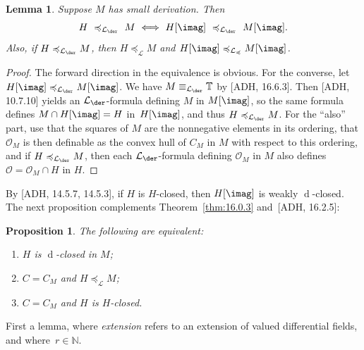 \documentclass[]{amsart}
\numberwithin{equation}{section}
\newcommand{\bbold}{\mathbb}
\def\N { {\bbold N} }
\def \d{\operatorname{d}}
\newtheorem{lemma}[theorem]{Lemma}
\newtheorem{prop}[theorem]{Proposition}
\theoremstyle{definition}
\theoremstyle{remark}
\renewcommand\leq{\leqslant}
\renewcommand\preceq{\preccurlyeq}
\begin{document}
\begin{lemma}
Suppose $M$ has small derivation. Then 
$$H\ \preceq_{\mathcal L_\der}\ M\ \Longleftrightarrow\ H[\imag]\ \preceq_{\mathcal L_\der}\ M[\imag].$$
Also, if $H\preceq_{\mathcal L_\der} M$, then $H\preceq_{\mathcal L} M$ and  $H[\imag]\preceq_{\mathcal{L}_{\preceq}} M[\imag]$.
\end{lemma}
\begin{proof}
The  forward direction in the equivalence is obvious. For the converse, let~$H[\imag]\preceq_{\mathcal L_\der}M[\imag]$.
We have  $M\equiv_{\mathcal{L}_{\der}}\mathbb T$ by [ADH, 16.6.3].
Then  [ADH, 10.7.10] yields an $\mathcal L_\der$-formula defining $M$ in $M[\imag]$,  so the same formula defines $M\cap H[\imag]=H$ in~$H[\imag]$, and thus $H\preceq_{\mathcal L_\der} M$. For the ``also'' part, use that the squares of $M$ are the nonnegative elements in its ordering,  that $\mathcal O_M$ is then definable as the convex hull of $C_M$ in $M$ with respect to this ordering, and
if $H\preceq_{\mathcal L_\der} M$, then each $\mathcal L_\der$-formula defining $\mathcal O_M$ in $M$ also defines $\mathcal O=\mathcal O_M\cap H$ in $H$.
\end{proof}

 
\noindent
By [ADH, 14.5.7, 14.5.3], if $H$ is $H$-closed, then $H[\imag]$ is weakly $\d$-closed.
The next proposition complements Theorem~\ref{thm:16.0.3} and~[ADH,   16.2.5]:  

\begin{prop}\label{prop:16.0.3 converse}
The following are equivalent:
\begin{enumerate}
\item[\textup{(i)}] $H$ is $\d$-closed in $M$;
\item[\textup{(ii)}]  $C=C_M$ and $H\preceq_{\mathcal L} M$;
\item[\textup{(iii)}] $C=C_M$ and $H$ is $H$-closed.
\end{enumerate}
\end{prop}

\noindent
First a lemma, where {\em extension\/} refers to an extension of valued differential fields, and where~$r\in\N$. 
\end{document}
